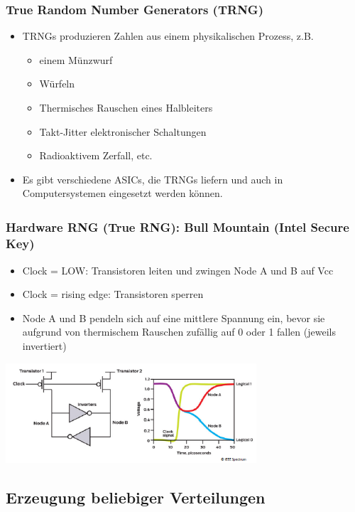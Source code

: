 \subsubsection{True Random Number Generators (TRNG)}
\begin{itemize}
	\item TRNGs produzieren Zahlen aus einem physikalischen Prozess, z.B.
	\begin{itemize}
		\item einem Münzwurf
		\item Würfeln
		\item Thermisches Rauschen eines Halbleiters
		\item Takt-Jitter elektronischer Schaltungen
		\item Radioaktivem Zerfall, etc.
	\end{itemize}
	\item Es gibt verschiedene ASICs, die TRNGs liefern und auch in Computersystemen eingesetzt werden können.
\end{itemize}

\subsubsection{Hardware RNG (True RNG): Bull Mountain (Intel\textsuperscript{\textregistered} Secure Key)}

\begin{itemize}
    \item Clock = LOW: Transistoren leiten und zwingen Node A und B auf Vcc
    \item Clock = rising edge: Transistoren sperren
    \item Node A und B pendeln sich auf eine mittlere Spannung ein, bevor sie aufgrund von thermischem Rauschen zufällig auf 0 oder 1 fallen (jeweils invertiert)
\end{itemize}

\includegraphics[width=0.7\textwidth]{images/Simulation/TRNG.png}

\subsection{Erzeugung beliebiger Verteilungen}
